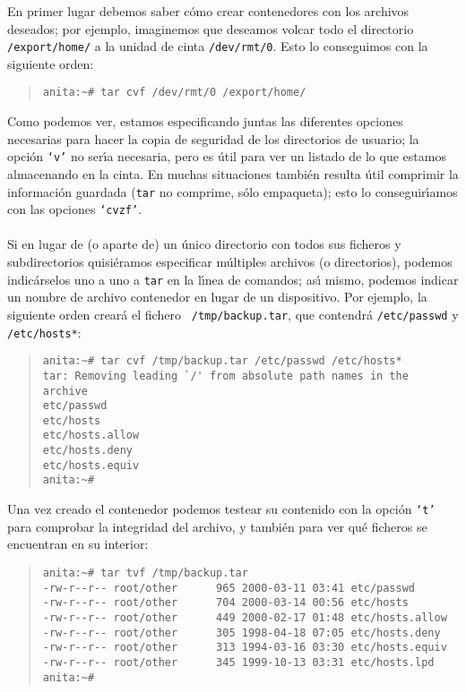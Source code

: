 En primer lugar debemos saber c\'omo crear contenedores con los archivos 
deseados; por ejemplo, imaginemos que deseamos volcar todo el directorio
{\tt /export/home/} a la unidad de cinta {\tt /dev/rmt/0}. Esto lo conseguimos
con la siguiente orden:
\begin{quote}
\begin{verbatim}
anita:~# tar cvf /dev/rmt/0 /export/home/
\end{verbatim}
\end{quote}
Como podemos ver, estamos especificando juntas las diferentes opciones
necesarias para hacer la copia de seguridad de los directorios de usuario; la
opci\'on {\tt `v'} no ser\'{\i}a necesaria, pero es \'util para ver un listado
de lo que estamos almacenando en la cinta. En muchas situaciones tambi\'en
resulta \'util comprimir la informaci\'on guardada ({\tt tar} no
comprime, s\'olo empaqueta); esto lo conseguir\'{\i}amos con las opciones
{\tt `cvzf'}.\\
\\Si en lugar de (o aparte de) un \'unico directorio con todos sus ficheros y 
subdirectorios quisi\'eramos especificar m\'ultiples archivos (o directorios),
podemos indic\'arselos uno a uno a {\tt tar} en la l\'{\i}nea de comandos; 
as\'{\i} mismo, podemos indicar un nombre de archivo contenedor en lugar de
un dispositivo. Por ejemplo, la siguiente orden crear\'a el fichero {\tt 
/tmp/backup.tar}, que contendr\'a {\tt /etc/passwd} y {\tt /etc/hosts*}: 
\begin{quote}
\begin{verbatim}
anita:~# tar cvf /tmp/backup.tar /etc/passwd /etc/hosts*
tar: Removing leading `/' from absolute path names in the archive
etc/passwd
etc/hosts
etc/hosts.allow
etc/hosts.deny
etc/hosts.equiv
anita:~# 
\end{verbatim}
\end{quote}
Una vez creado el contenedor podemos testear su contenido con la opci\'on
{\tt `t'} para comprobar la integridad del archivo, y tambi\'en para ver qu\'e
ficheros se encuentran en su interior:
\begin{quote}
\begin{verbatim}
anita:~# tar tvf /tmp/backup.tar
-rw-r--r-- root/other      965 2000-03-11 03:41 etc/passwd
-rw-r--r-- root/other      704 2000-03-14 00:56 etc/hosts
-rw-r--r-- root/other      449 2000-02-17 01:48 etc/hosts.allow
-rw-r--r-- root/other      305 1998-04-18 07:05 etc/hosts.deny
-rw-r--r-- root/other      313 1994-03-16 03:30 etc/hosts.equiv
-rw-r--r-- root/other      345 1999-10-13 03:31 etc/hosts.lpd
anita:~# 
\end{verbatim}
\end{quote}
